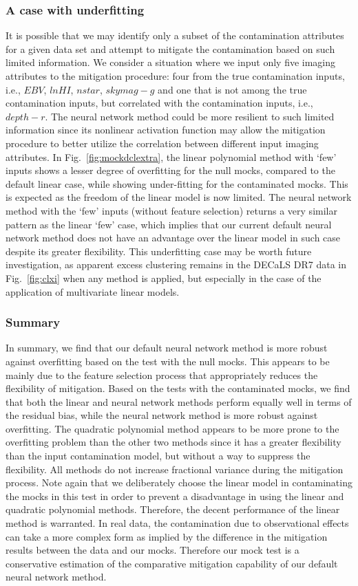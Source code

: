 \documentclass[fleqn, usenatbib]{mnras}
\begin{document}
\subsubsection{A case with underfitting}
It is possible that we may identify only a subset of the contamination attributes for a given data set and attempt to mitigate the contamination based on such limited information. We consider a situation where we input only five imaging attributes to the mitigation procedure: four from the true contamination inputs, i.e., $EBV$, $lnHI$, $nstar$, $skymag-g$ and one that is not among the true contamination inputs, but correlated with the contamination inputs, i.e., $depth-r$. The neural network method could be more resilient to such limited information since its nonlinear activation function may allow the mitigation procedure to better utilize the correlation between different input imaging attributes. In Fig.~\ref{fig:mockdclextra}, the linear polynomial method with `few' inputs shows a lesser degree of overfitting for the null mocks, compared to the default linear case, while showing under-fitting for the contaminated mocks. This is expected as the freedom of the linear model is now limited.  The neural network method with the `few' inputs (without feature selection) returns a very similar pattern as the linear `few' case, which implies that our current default neural network method does not have an advantage over the linear model in such case despite its greater flexibility. This underfitting case may be worth future investigation, as apparent excess clustering remains in the DECaLS DR7 data in Fig.~\ref{fig:clxi} when any method is applied, but especially in the case of the application of multivariate linear models.

\subsubsection{Summary}
In summary, we find that our default neural network method is more robust against overfitting based on the test with the null mocks. This appears to be mainly due to the feature selection process that appropriately reduces the flexibility of mitigation. Based on the tests with the contaminated mocks, we find that both the linear and neural network methods perform equally well in terms of the residual bias, while the neural network method is more robust against overfitting. The quadratic polynomial method appears to be more prone to the overfitting problem than the other two methods since it has a greater flexibility than the input contamination model, but without a way to suppress the flexibility. All methods do not increase fractional variance during the mitigation process. Note again that we deliberately choose the linear model in contaminating the mocks in this test in order to prevent a disadvantage in using the linear and quadratic polynomial methods.  Therefore, the decent performance of the linear method is warranted. In real data, the contamination due to observational effects can take a more complex form as implied by the difference in the mitigation results between the data and our mocks. Therefore our mock test is a conservative estimation of the comparative mitigation capability of our default neural network method. 
\end{document}
